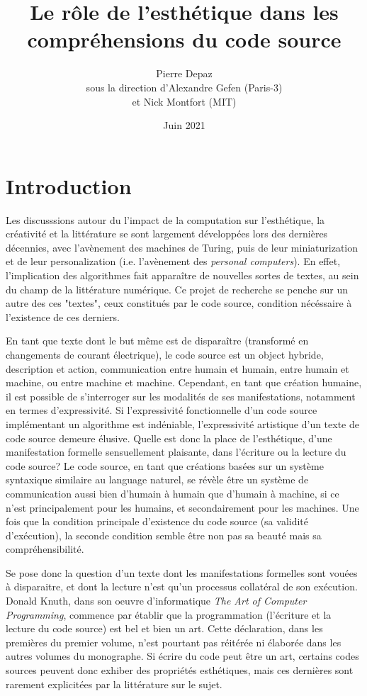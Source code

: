 \documentclass{article}
\begin{document}
\title{Le rôle de l'esthétique dans les compréhensions du code source}
\author{Pierre Depaz\\sous la direction d'Alexandre Gefen (Paris-3)\\et Nick Montfort (MIT)}
\date{Juin 2021}
\maketitle

\section{Introduction}

Les discusssions autour du l'impact de la computation sur l'esthétique, la créativité et la littérature se sont largement développées lors des dernières décennies, avec l'avènement des machines de Turing, puis de leur miniaturization et de leur personalization (i.e. l'avènement des \emph{personal computers}). En effet, l'implication des algorithmes fait apparaître de nouvelles sortes de textes, au sein du champ de la littérature numérique. Ce projet de recherche se penche sur un autre des ces "textes", ceux constitués par le code source, condition nécéssaire à l'existence de ces derniers.

En tant que texte dont le but même est de disparaître (transformé en changements de courant électrique), le code source est un object hybride, description et action, communication entre humain et humain, entre humain et machine, ou entre machine et machine. Cependant, en tant que création humaine, il est possible de s'interroger sur les modalités de ses manifestations, notamment en termes d'expressivité. Si l'expressivité fonctionnelle d'un code source implémentant un algorithme est indéniable, l'expressivité artistique d'un texte de code source demeure élusive. Quelle est donc la place de l'esthétique, d'une manifestation formelle sensuellement plaisante, dans l'écriture ou la lecture du code source? Le code source, en tant que créations basées sur un système syntaxique similaire au language naturel, se révèle être un système de communication aussi bien d'humain à humain que d'humain à machine, si ce n'est principalement pour les humains, et secondairement pour les machines\cite{abelson_structure_1979}. Une fois que la condition principale d'existence du code source (sa validité d'exécution), la seconde condition semble être non pas sa beauté mais sa compréhensibilité.

Se pose donc la question d'un texte dont les manifestations formelles sont vouées à disparaitre, et dont la lecture n'est qu'un processus collatéral de son exécution. Donald Knuth, dans son oeuvre d'informatique \emph{The Art of Computer Programming}\cite{knuth_art_1997}, commence par établir que la programmation (l'écriture et la lecture du code source) est bel et bien un art. Cette déclaration, dans les premières du premier volume, n'est pourtant pas réitérée ni élaborée dans les autres volumes du monographe. Si écrire du code peut être un art, certains codes sources peuvent donc exhiber des propriétés esthétiques, mais ces dernières sont rarement explicitées par la littérature sur le sujet.
\end{document}

